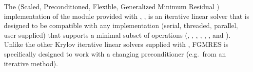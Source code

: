 
The {\spfgmr} (Scaled, Preconditioned, Flexible, Generalized Minimum
Residual \cite{Saa:93}) implementation of the {\sunlinsol} module
provided with {\sundials}, {\sunlinsolspfgmr}, is an iterative linear
solver that is designed to be compatible with any {\nvector}
implementation (serial, threaded, parallel, user-supplied) that
supports a minimal subset of operations (,
, , , ,
,  and ).  Unlike the other
Krylov iterative linear solvers supplied with {\sundials}, FGMRES is
specifically designed to work with a changing preconditioner
(e.g.~from an iterative method).


